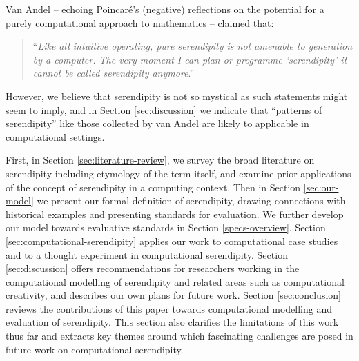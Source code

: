 Van Andel \citeyear{van1994anatomy} -- echoing Poincar\'e's
\citeyear{poincare1910creation} (negative) reflections on the potential
for a purely computational approach to mathematics -- claimed that:
\begin{quote}
``\emph{Like all intuitive operating, pure serendipity is not amenable
    to generation by a computer.  The very moment I can plan or
    programme `serendipity' it cannot be called serendipity
    anymore}.'' \cite{van1994anatomy}
\end{quote}
However, we believe that serendipity is not so mystical as such statements
might seem to imply, and in Section \ref{sec:discussion} we indicate
that ``patterns of serendipity'' like those collected by van Andel
are likely to applicable in computational settings.

First, in
Section \ref{sec:literature-review}, we survey the broad literature on
serendipity including etymology of the term itself, and examine prior applications of the concept of serendipity in a computing context.  Then in Section \ref{sec:our-model} we present our formal
definition of serendipity, drawing connections with historical examples 
and presenting standards for evaluation.  We further develop our model towards evaluative standards in Section \ref{specs-overview}. Section
\ref{sec:computational-serendipity} applies our work to computational case studies and
to a thought experiment in computational serendipity.  Section
\ref{sec:discussion} offers recommendations for researchers working in the computational modelling of serendipity and related areas such as computational creativity, and describes our own plans for future
work.  Section \ref{sec:conclusion} reviews the contributions of this paper towards computational modelling and evaluation of serendipity. This section also clarifies the limitations of this work thus far and extracts key themes around which fascinating challenges are posed in future work on computational serendipity.


